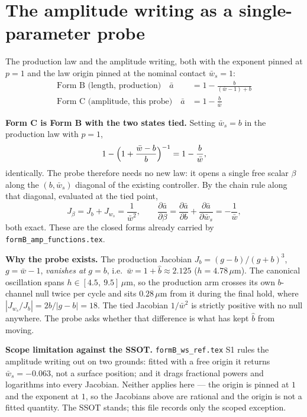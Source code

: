 \documentclass[11pt,a4paper,fontset=none]{ctexart}
\begin{document}
\section*{The amplitude writing as a single-parameter probe}

The production law and the amplitude writing, both with the exponent pinned at
$p=1$ and the law origin pinned at the nominal contact $\bar{w}_s = 1$:
\begin{align*}
\text{Form B (length, production)}\quad
  \bar{a} &= 1 - \frac{b}{(\bar{w}-1) + b} \\
\text{Form C (amplitude, this probe)}\quad
  \bar{a} &= 1 - \frac{b}{\bar{w}}
\end{align*}

\textbf{Form C is Form B with the two states tied.} Setting $\bar{w}_s = b$ in
the production law with $p=1$,
\begin{equation*}
1 - \Bigl(1 + \frac{\bar{w}-b}{b}\Bigr)^{-1}
  = 1 - \frac{b}{\bar{w}} ,
\end{equation*}
identically. The probe therefore needs no new law: it opens a single free
scalar $\beta$ along the $(b,\bar{w}_s)$ diagonal of the existing controller.
By the chain rule along that diagonal, evaluated at the tied point,
\begin{equation*}
J_\beta = J_b + J_{w_s} = \frac{1}{\bar{w}^{2}} ,
\qquad
\frac{\partial\bar{a}}{\partial\beta}
  = \frac{\partial\bar{a}}{\partial b}
  + \frac{\partial\bar{a}}{\partial \bar{w}_s}
  = -\frac{1}{\bar{w}} ,
\end{equation*}
both exact. These are the closed forms already carried by
\texttt{formB\_amp\_functions.tex}.

\textbf{Why the probe exists.} The production Jacobian
$J_b = (g-b)/(g+b)^3$, $g = \bar{w}-1$, \emph{vanishes at} $g = b$, i.e.\
$\bar{w} = 1 + \hat{b} \approx 2.125$ ($h = 4.78\,\mu$m). The canonical
oscillation spans $h \in [4.5,\ 9.5]\,\mu$m, so the production arm crosses its
own $b$-channel null twice per cycle and sits $0.28\,\mu$m from it during the
final hold, where $|J_{w_s}/J_b| = 2b/|g-b| = 18$. The tied Jacobian
$1/\bar{w}^{2}$ is strictly positive with no null anywhere. The probe asks
whether that difference is what has kept $\hat{b}$ from moving.

\textbf{Scope limitation against the SSOT.}
\texttt{formB\_ws\_ref.tex} S1 rules the amplitude writing out on two grounds:
fitted with a free origin it returns $\bar{w}_s = -0.063$, not a surface
position; and it drags fractional powers and logarithms into every Jacobian.
Neither applies here --- the origin is pinned at $1$ and the exponent at $1$,
so the Jacobians above are rational and the origin is not a fitted quantity.
The SSOT stands; this file records only the scoped exception.
\end{document}
